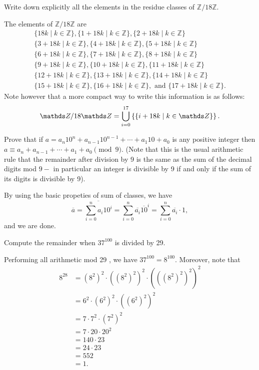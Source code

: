 \begin{questions}
\question
    Write down explicitly all the elements in the residue classes of \(\mathbb{Z} / 18 \mathbb{Z}\).
\begin{solution} The elements of \(\mathbb{Z} / 18 \mathbb{Z}\) are 
    $$\begin{gathered}
        \{18 k \mid k \in \mathbb{Z}\},\{1+18 k \mid k \in \mathbb{Z}\},\{2+18 k \mid k \in \mathbb{Z}\} \\
        \{3+18 k \mid k \in \mathbb{Z}\},\{4+18 k \mid k \in \mathbb{Z}\},\{5+18 k \mid k \in \mathbb{Z}\} \\
        \{6+18 k \mid k \in \mathbb{Z}\},\{7+18 k \mid k \in \mathbb{Z}\},\{8+18 k \mid k \in \mathbb{Z}\} \\
        \{9+18 k \mid k \in \mathbb{Z}\},\{10+18 k \mid k \in \mathbb{Z}\},\{11+18 k \mid k \in \mathbb{Z}\} \\
        \{12+18 k \mid k \in \mathbb{Z}\},\{13+18 k \mid k \in \mathbb{Z}\},\{14+18 k \mid k \in \mathbb{Z}\} \\
        \{15+18 k \mid k \in \mathbb{Z}\},\{16+18 k \mid k \in \mathbb{Z}\},\text{ and }\{17+18 k \mid k \in \mathbb{Z}\}.
        \end{gathered}$$
    Note however that a more compact way to write this information is as follows: \[
        \Z/18\Z = \bigcup_{i=0}^{17} \left\{ \{i+18k \mid k\in \Z\} \right\}.
    \]
\end{solution}

\question
    Prove that if \(a=a_n 10^n+a_{n-1} 10^{n-1}+\cdots+a_1 10+a_0\) is any positive integer then \(a \equiv a_n+a_{n-1}+\cdots+a_1+a_0\pmod 9\). (Note that this is the usual arithmetic rule that the remainder after division by 9 is the same as the sum of the decimal digits mod \(9-\) in particular an integer is divisible by 9 if and only if the sum of its digits is divisible by 9).
\begin{solution} By using the basic propeties of sum of classes, we have
    \[
        \overline{a}=\overline{\sum_{i=0}^n a_{i} 10^i}=\sum_{i=0}^n{\overline{a_i}}\overline{10}^i=\sum_{i=0}^n \overline{a_i} \cdot 1,
    \] 
    and we are done.
\end{solution}

\question
    Compute the remainder when \(37^{100}\) is divided by 29.

\begin{solution}
    Performing all arithmetic mod 29 , we have \(37^{100}=8^{100}\). Moreover, note that
\[
\begin{aligned}
8^{28} & =\left(8^2\right)^2 \cdot\left(\left(8^2\right)^2\right)^2 \cdot\left(\left(\left(8^2\right)^2\right)^2\right)^2 \\
& =6^2 \cdot\left(6^2\right)^2 \cdot\left(\left(6^2\right)^2\right)^2 \\
& =7 \cdot 7^2 \cdot\left(7^2\right)^2 \\
& =7 \cdot 20 \cdot 20^2 \\
& =140 \cdot 23 \\
& =24 \cdot 23 \\
& =552 \\
& =1 .
\end{aligned}
\]


\end{solution}
\end{questions}
